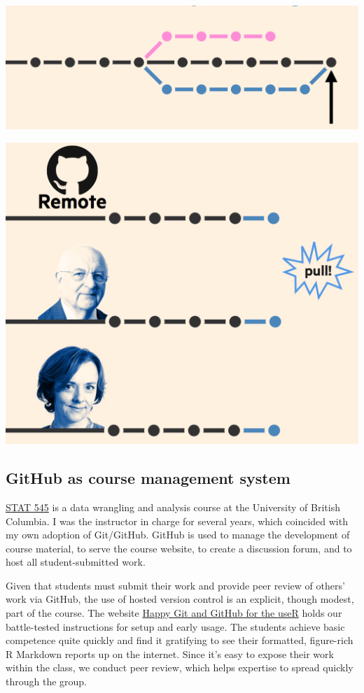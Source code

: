 \documentclass[12pt]{article}
\begin{document}
\includegraphics[width=1\linewidth]{bartlett-merge-commit}

\includegraphics[width=1\linewidth]{bartlett-pull}

\subsection{GitHub as course management
system}\label{github-as-course-management-system}

\href{http://stat545.com}{STAT 545} is a data wrangling and analysis
course at the University of British Columbia. I was the instructor in
charge for several years, which coincided with my own adoption of
Git/GitHub. GitHub is used to manage the development of course material,
to serve the course website, to create a discussion forum, and to host
all student-submitted work.

Given that students must submit their work and provide peer review of
others' work via GitHub, the use of hosted version control is an
explicit, though modest, part of the course. The website
\href{http://happygitwithr.com}{Happy Git and GitHub for the useR} holds
our battle-tested instructions for setup and early usage. The students
achieve basic competence quite quickly and find it gratifying to see
their formatted, figure-rich R Markdown reports up on the internet.
Since it's easy to expose their work within the class, we conduct peer
review, which helps expertise to spread quickly through the group.
\end{document}

